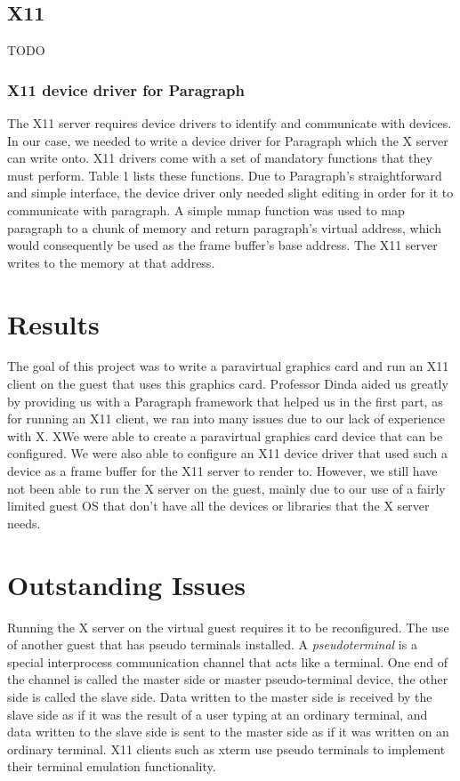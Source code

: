 \documentclass{acm_proc_article-sp}
\begin{document}
\subsection{X11}
 TODO
\subsubsection{X11 device driver for Paragraph}
The X11 server requires device drivers to identify and communicate with devices.
In our case, we needed to write a device driver for Paragraph which the X server can
write onto.
X11 drivers come with a set of mandatory functions that they must perform. Table
1 lists these functions. 
Due to Paragraph's straightforward and simple interface, the device driver only
needed slight editing in order for it to communicate with paragraph. A simple
mmap function was used to map paragraph to a chunk of memory and return
paragraph's virtual address, which would consequently be used as the frame
buffer's base address. The X11 server writes to the memory at that address. 
\section{Results}
The goal of this project was to write a paravirtual graphics card and run an X11
client on the guest that uses this graphics card. Professor Dinda aided us
greatly by providing us with a Paragraph framework that helped us in the first
part, as for running an X11 client, we ran into many issues due to our lack of
experience with X. XWe were able to create a paravirtual graphics card device
that can be configured. 
We were also able to configure an X11 device driver that used such a device as a
frame buffer for the X11 server to render to. However, we still have not been able to run
the X server on the guest, mainly due to our use of a fairly limited guest OS
that don't have all the devices or libraries that the X server needs.
\section{Outstanding Issues}
Running the X server on the virtual guest requires it to be reconfigured. The
use of another guest that has pseudo terminals installed. A
\textit{pseudo\textunderscore terminal} is a special interprocess communication
channel that acts like a terminal. One end of the channel is called the master side or master pseudo-terminal device, 
the other side is called the slave side. 
Data written to the master side is received by the slave side as if it was the result of a user typing at an ordinary terminal, 
and data written to the slave side is sent to the master side as if it was written on an ordinary terminal.
X11 clients such as xterm use pseudo terminals to implement their terminal emulation functionality.
\end{document}
